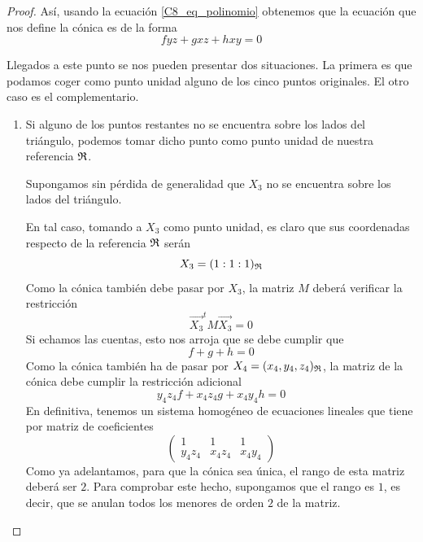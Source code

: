 \begin{proof}
Así, usando la ecuación \ref{C8_eq_polinomio} obtenemos que la ecuación que nos define la cónica es de la forma
\begin{equation}
	fyz+gxz+hxy=0
\end{equation}

	Llegados a este punto se nos pueden presentar dos situaciones. La primera es que podamos coger como punto unidad alguno de los cinco puntos originales. El otro caso es el complementario.
	\begin{enumerate}
		\item Si alguno de los puntos restantes no se encuentra sobre los lados del triángulo, podemos tomar dicho punto como punto unidad de nuestra referencia $\mathfrak{R}$. 
		
		Supongamos sin pérdida de generalidad que $X_3$ no se encuentra sobre los lados del triángulo.
		
		En tal caso, tomando a $X_3$ como punto unidad, es claro que sus coordenadas respecto de la referencia $\mathfrak{R}$ serán
		\begin{equation*}
			X_3=(1:1:1)_{\mathfrak{R}}
		\end{equation*}
		Como la cónica también debe pasar por $X_3$, la matriz $M$ deberá verificar la restricción
		\begin{equation*}
			\vec{X_3}^tM\vec{X_3}=0
		\end{equation*}
		Si echamos las cuentas, esto nos arroja que se debe cumplir que
		\begin{equation*}
			f+g+h=0
		\end{equation*}
		Como la cónica también ha de pasar por $X_4=(x_4,y_4,z_4)_{\mathfrak{R}}$, la matriz de la cónica debe cumplir la restricción adicional
		\begin{equation*}
			y_4z_4f+x_4z_4g+x_4y_4h=0
		\end{equation*}
	En definitiva, tenemos un sistema homogéneo de ecuaciones lineales que tiene por matriz de coeficientes
	\begin{equation}
		\begin{pmatrix}
		1 & 1 & 1\\
		y_4z_4 & x_4z_4 & x_4y_4
		\end{pmatrix}
	\end{equation}
	Como ya adelantamos, para que la cónica sea única, el rango de esta matriz deberá ser $2$. Para comprobar este hecho, supongamos que el rango es $1$, es decir, que se anulan todos los menores de orden $2$ de la matriz.
	

\end{enumerate}
\end{proof}
